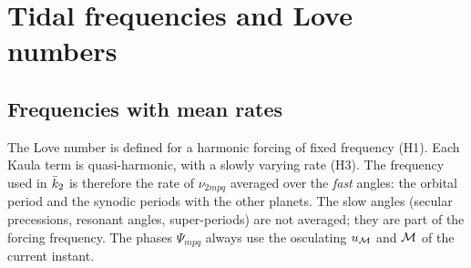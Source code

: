 \section{Tidal frequencies and Love numbers}\label{sec:love}
\subsection{Frequencies with mean rates}\label{sec:rates}
The Love number is defined for a harmonic forcing of fixed frequency (H1). Each Kaula term is quasi-harmonic, with a slowly varying rate (H3). The frequency used in $\bar k_2$ is therefore the rate of $\nu_{2mpq}$ averaged over the \emph{fast} angles: the orbital period and the synodic periods with the other planets. The slow angles (secular precessions, resonant angles, super-periods) are not averaged; they are part of the forcing frequency. The phases $\Psi_{mpq}$ always use the osculating $u_{\mathcal{M}}$ and $\mathcal{M}$ of the current instant.

